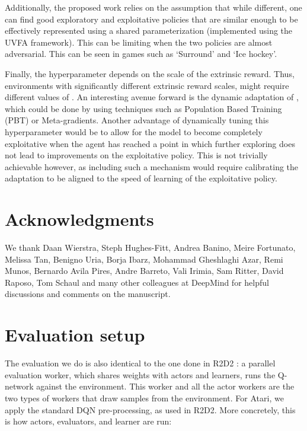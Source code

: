 \documentclass{article} \usepackage{iclr2020_conference,times}
\begin{document}
Additionally, the proposed work relies on the assumption that while different, one can find good exploratory and exploitative policies that are similar enough to be effectively represented using a shared parameterization (implemented using the UVFA framework). This can be limiting when the two policies are almost adversarial. This can be seen in games such as ‘Surround’ and ‘Ice hockey’.

Finally, the hyperparameter  depends on the scale of the extrinsic reward. Thus, environments with significantly different extrinsic reward scales, might require different values of . An interesting avenue forward is the dynamic adaptation of , which could be done by using techniques such as Population Based Training (PBT)\citep{jaderberg2017population} or Meta-gradients\citep{xu2018meta}. Another advantage of dynamically tuning this hyperparameter would be to allow for the model to become completely exploitative when the agent has reached a point in which further exploring does not lead to improvements on the exploitative policy. This is not trivially achievable however, as including such a mechanism would require calibrating the adaptation to be aligned to the speed of learning of the exploitative policy. 

\section*{Acknowledgments}
We thank Daan Wierstra, Steph Hughes-Fitt, Andrea Banino, Meire Fortunato, Melissa Tan, Benigno Uria, Borja Ibarz, Mohammad Gheshlaghi Azar, Remi Munos, Bernardo Avila Pires, Andre Barreto, Vali Irimia, Sam Ritter, David Raposo, Tom Schaul and many other colleagues at DeepMind for helpful discussions and comments on the manuscript.



\clearpage
\newpage


\appendix

\section{Evaluation setup}
\label{evaluation_setup}
The evaluation we do is also identical to the one done in R2D2 \cite{r2d2}: a parallel evaluation worker, which shares weights with actors and learners, runs the Q-network against the environment. This worker and all the actor workers are the two types of workers that draw samples from the environment. For Atari, we apply the standard DQN pre-processing, as used in R2D2. More concretely, this is how actors, evaluators, and learner are run:
\end{document}

